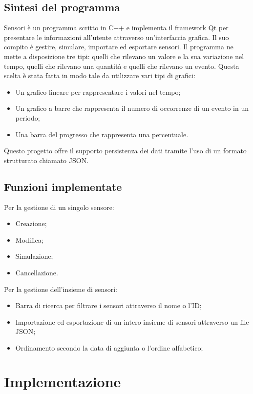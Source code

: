 \documentclass[a4paper]{article}
\begin{document}
\subsection{Sintesi del programma}
Sensori è un programma scritto in C++ e implementa il framework Qt per presentare le informazioni all'utente attraverso un'interfaccia grafica. Il suo compito è gestire, simulare, importare ed esportare sensori.
Il programma ne mette a disposizione tre tipi: quelli che rilevano un valore e la sua variazione nel tempo, quelli che rilevano una quantità e quelli che rilevano un evento.
Questa scelta è stata fatta in modo tale da utilizzare vari tipi di grafici: 
\begin{itemize}
    \item Un grafico lineare per rappresentare i valori nel tempo;
    \item Un grafico a barre che rappresenta il numero di occorrenze di un evento in un periodo;
    \item Una barra del progresso che rappresenta una percentuale.
\end{itemize}
Questo progetto offre il supporto persistenza dei dati tramite l'uso di un formato strutturato chiamato JSON.
\subsection{Funzioni implementate}
Per la gestione di un singolo sensore:
\begin{itemize}
    \item Creazione;
    \item Modifica;
    \item Simulazione;
    \item Cancellazione.
\end{itemize}
Per la gestione dell'insieme di sensori:
\begin{itemize}
    \item Barra di ricerca per filtrare i sensori attraverso il nome o l'ID;
    \item Importazione ed esportazione di un intero insieme di sensori attraverso un file JSON;
    \item Ordinamento secondo la data di aggiunta o l'ordine alfabetico;
\end{itemize}
\clearpage
\section{Implementazione}
\end{document}

